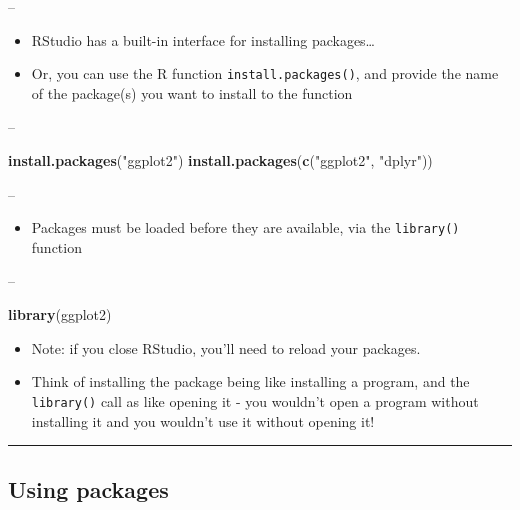 \documentclass[]{article}
\newenvironment{Shaded}{\begin{snugshade}}{\end{snugshade}}
\newcommand{\KeywordTok}[1]{\textcolor[rgb]{0.13,0.29,0.53}{\textbf{#1}}}
\newcommand{\NormalTok}[1]{#1}
\newcommand{\StringTok}[1]{\textcolor[rgb]{0.31,0.60,0.02}{#1}}
\providecommand{\tightlist}{%
  \setlength{\itemsep}{0pt}\setlength{\parskip}{0pt}}
\begin{document}
--

\begin{itemize}
\tightlist
\item
  RStudio has a built-in interface for installing packages\ldots{}
\item
  Or, you can use the R function \texttt{install.packages()}, and
  provide the name of the package(s) you want to install to the function
\end{itemize}

--

\begin{Shaded}
\begin{Highlighting}[]
\KeywordTok{install.packages}\NormalTok{(}\StringTok{"ggplot2"}\NormalTok{)}
\KeywordTok{install.packages}\NormalTok{(}\KeywordTok{c}\NormalTok{(}\StringTok{"ggplot2"}\NormalTok{, }\StringTok{"dplyr"}\NormalTok{))}
\end{Highlighting}
\end{Shaded}

--

\begin{itemize}
\tightlist
\item
  Packages must be loaded before they are available, via the
  \texttt{library()} function
\end{itemize}

--

\begin{Shaded}
\begin{Highlighting}[]
\KeywordTok{library}\NormalTok{(ggplot2)}
\end{Highlighting}
\end{Shaded}

\begin{itemize}
\tightlist
\item
  Note: if you close RStudio, you'll need to reload your packages.
\item
  Think of installing the package being like installing a program, and
  the \texttt{library()} call as like opening it - you wouldn't open a
  program without installing it and you wouldn't use it without opening
  it!
\end{itemize}

\begin{center}\rule{0.5\linewidth}{\linethickness}\end{center}

\hypertarget{using-packages}{%
\subsection{Using packages}\label{using-packages}}
\end{document}
